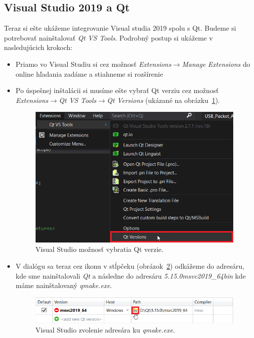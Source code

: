 \begin{itemize}
\subsection{Visual Studio 2019 a Qt}
\label{kap4:sec:VS2019_qt}
Teraz si ešte ukážeme integrovanie Visual studia 2019 spolu s Qt. Budeme si potrebovať nainštalovať \textit{Qt VS Tools}. Podrobný postup si ukážeme v nasledujúcich krokoch:
\begin{itemize}
\label{kap4:qt_vs_integ}
\item Priamo vo Visual Studiu si cez možnosť \textit{Extensions}$\rightarrow$\textit{Manage Extensions} do online hľadania zadáme  a stiahneme si rozšírenie ~\cite{qt_vs_tools}
\item\label{kap4:qt_vs_integ:krok2} Po úspešnej inštalácii si musíme ešte vybrať Qt verziu cez možnosť \textit{Extensions}$\rightarrow$\textit{Qt VS Tools}$\rightarrow$\textit{Qt Versions} (ukázané na obrázku~\ref{obr:kap4:vs_versions}).

\begin{figure}[!htb]
	\centering
	\includegraphics[width=12cm]{img/kap04_vs_versions}
	\caption{Visual Studio možnosť vybratia Qt verzie.}
	\label{obr:kap4:vs_versions}
\end{figure}

\item V dialógu sa teraz cez ikonu v stĺpčeku  (obrázok~\ref{obr:kap4:vs_path}) odkážeme do adresáru, kde sme nainštalovali \textit{Qt} a následne do adresáru \textit{5.15.0\/msvc2019\_64\/bin} kde máme nainštalovaný \textit{qmake.exe}.

\begin{figure}[!htb]
	\centering
	\includegraphics[width=12cm]{img/kap04_vs_path}
	\caption{Visual Studio zvolenie adresára ku \textit{qmake.exe}.}
	\label{obr:kap4:vs_path}
\end{figure}


\end{itemize}
\end{itemize}
